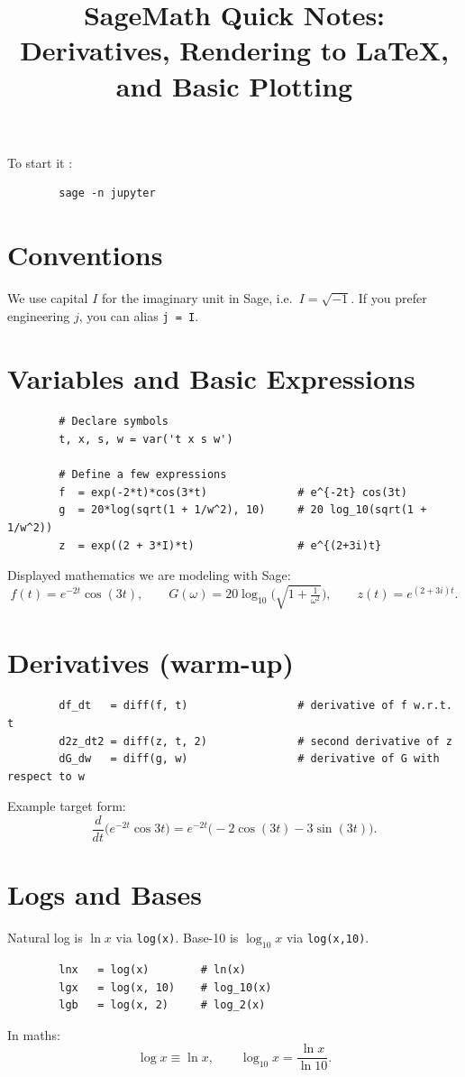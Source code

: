 \documentclass[11pt,a4paper]{article}
\title{SageMath Quick Notes: Derivatives, Rendering to LaTeX, and Basic Plotting}
\author{}
\date{}
\begin{document}
	\maketitle
	To start it :
	
	\begin{verbatim}
		sage -n jupyter
	\end{verbatim}
	
	\section*{Conventions}
	We use capital $I$ for the imaginary unit in Sage, i.e.\ $I=\sqrt{-1}$. 
	If you prefer engineering $j$, you can alias \verb|j = I|.
	
	\section{Variables and Basic Expressions}
	\begin{verbatim}
		# Declare symbols
		t, x, s, w = var('t x s w')
		
		# Define a few expressions
		f  = exp(-2*t)*cos(3*t)              # e^{-2t} cos(3t)
		g  = 20*log(sqrt(1 + 1/w^2), 10)     # 20 log_10(sqrt(1 + 1/w^2))
		z  = exp((2 + 3*I)*t)                # e^{(2+3i)t}
	\end{verbatim}
	
	Displayed mathematics we are modeling with Sage:
	$$
	f(t)=e^{-2t}\cos(3t),\qquad
	G(\omega)=20\log_{10}\Big(\sqrt{1+\tfrac{1}{\omega^2}}\Big),\qquad
	z(t)=e^{(2+3i)t}.
	$$
	
	\section{Derivatives (warm-up)}
	\begin{verbatim}
		df_dt   = diff(f, t)                 # derivative of f w.r.t. t
		d2z_dt2 = diff(z, t, 2)              # second derivative of z
		dG_dw   = diff(g, w)                 # derivative of G with respect to w
	\end{verbatim}
	
	Example target form:
	$$
	\frac{d}{dt}\big(e^{-2t}\cos 3t\big)
	= e^{-2t}\big(-2\cos(3t) - 3\sin(3t)\big).
	$$
	
	\section{Logs and Bases}
	Natural log is $\ln x$ via \verb|log(x)|. 
	Base-10 is $\log_{10}x$ via \verb|log(x,10)|.
	\begin{verbatim}
		lnx   = log(x)        # ln(x)
		lgx   = log(x, 10)    # log_10(x)
		lgb   = log(x, 2)     # log_2(x)
	\end{verbatim}
	In maths:
	$$
	\log x \equiv \ln x,\qquad \log_{10}x = \frac{\ln x}{\ln 10}.
	$$
	
\end{document}
